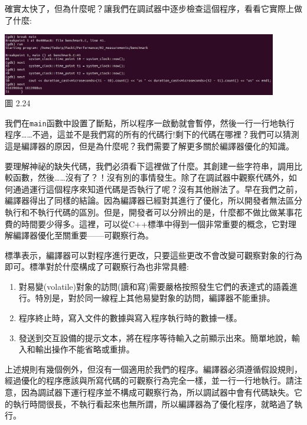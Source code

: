 確實太快了，但為什麼呢？讓我們在調試器中逐步檢查這個程序，看看它實際上做了什麼:

\begin{center}
\includegraphics[width=0.9\textwidth]{content/1/chapter2/images/24.jpg}\\
圖 2.24
\end{center}

我們在\texttt{main}函數中設置了斷點，所以程序一啟動就會暫停，然後一行一行地執行程序……不過，這並不是我們寫的所有的代碼行!剩下的代碼在哪裡？我們可以猜測這是編譯器的原因，但是為什麼呢？我們需要了解更多關於編譯器優化的知識。


要理解神祕的缺失代碼，我們必須看下這裡做了什麼。其創建一些字符串，調用比較函數，然後……沒有了？！沒有別的事情發生。除了在調試器中觀察代碼外，如何通過運行這個程序來知道代碼是否執行了呢？沒有其他辦法了。早在我們之前，編譯器得出了同樣的結論。因為編譯器已經對其進行了優化，所以開發者無法區分執行和不執行代碼的區別。但是，開發者可以分辨出的是，什麼都不做比做某事花費的時間要少得多。這裡，可以從C++標準中得到一個非常重要的概念，它對理解編譯器優化至關重要——可觀察行為。

標準表示，編譯器可以對程序進行更改，只要這些更改不會改變可觀察對象的行為即可。標準對於什麼構成了可觀察行為也非常具體:

\begin{enumerate}
\item 對易變(volatile)對象的訪問(讀和寫)需要嚴格按照發生它們的表達式的語義進行。特別是，對於同一線程上其他易變對象的訪問，編譯器不能重排。

\item 程序終止時，寫入文件的數據與寫入程序執行時的數據一樣。

\item 發送到交互設備的提示文本，將在程序等待輸入之前顯示出來。簡單地說，輸入和輸出操作不能省略或重排。
\end{enumerate}

上述規則有幾個例外，但沒有一個適用於我們的程序。編譯器必須遵循假設規則，經過優化的程序應該與所寫代碼的可觀察行為完全一樣，並一行一行地執行。請注意，因為調試器下運行程序並不構成可觀察行為，所以調試器中會有代碼缺失。它的執行時間很長，不執行看起來也無所謂，所以編譯器為了優化程序，就略過了執行。

